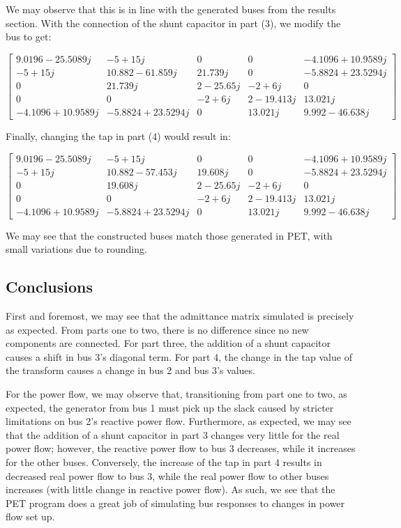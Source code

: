\documentclass[
	letterpaper, %
	10pt, %
]{CSUniSchoolLabReport}
\begin{document}
We may observe that this is in line with the generated buses from the results section. With the connection of the shunt capacitor in part (3), we modify the bus to get:

$$\boxed{\left[ \begin{matrix} 9.0196-25.5089j & -5+15j & 0 & 0 & -4.1096+10.9589j\\ -5+15j & 10.882-61.859j & 21.739j & 0 & -5.8824+23.5294j\\ 0 & 21.739j & 2-25.65j & -2+6j & 0\\ 0 & 0 & -2+6j & 2-19.413j & 13.021j\\ -4.1096+10.9589j & -5.8824+23.5294j & 0 & 13.021j & 9.992-46.638j \end{matrix} \right]}$$

Finally, changing the tap in part (4) would result in:

$$\boxed{\left[ \begin{matrix} 9.0196-25.5089j & -5+15j & 0 & 0 & -4.1096+10.9589j\\ -5+15j & 10.882-57.453j & 19.608j & 0 & -5.8824+23.5294j\\ 0 & 19.608j & 2-25.65j & -2+6j & 0\\ 0 & 0 & -2+6j & 2-19.413j & 13.021j\\ -4.1096+10.9589j & -5.8824+23.5294j & 0 & 13.021j & 9.992-46.638j \end{matrix} \right]}$$

We may see that the constructed buses match those generated in PET, with small variations due to rounding.

\subsection{Conclusions}

First and foremost, we may see that the admittance matrix simulated is precisely as expected. From parts one to two, there is no difference since no new components are connected. For part three, the addition of a shunt capacitor causes a shift in bus 3's diagonal term. For part 4, the change in the tap value of the transform causes a change in bus 2 and bus 3's values.

For the power flow, we may observe that, transitioning from part one to two, as expected, the generator from bus 1 must pick up the slack caused by stricter limitations on bus 2's reactive power flow. Furthermore, as expected, we may see that the addition of a shunt capacitor in part 3 changes very little for the real power flow; however, the reactive power flow to bus 3 decreases, while it increases for the other buses. Conversely, the increase of the tap in part 4 results in decreased real power flow to bus 3, while the real power flow to other buses increases (with little change in reactive power flow). As such, we see that the PET program does a great job of simulating bus responses to changes in power flow set up.
\end{document}
